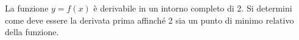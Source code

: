 La funzione $y=f(x)$ è derivabile in un intorno completo di 2. 
Si determini come deve essere la derivata prima affinché 2 sia
un punto di minimo relativo della funzione.
